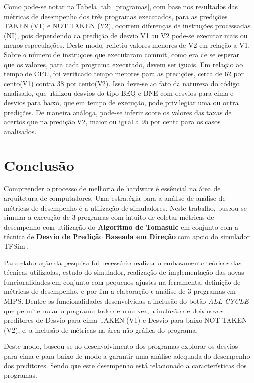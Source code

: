 \documentclass[12pt]{article}
\begin{document}
Como pode-se notar na Tabela \ref{tab_programas}, com base nos resultados das métricas de desempenho dos três programas executados, para as predições TAKEN (V1) e NOT TAKEN (V2), ocorrem diferenças de instruções processadas (NI), pois dependendo da predição de desvio V1 ou V2 pode-se executar mais ou menos especulações. Deste modo, refletiu valores menores de V2 em relação a V1. Sobre o número de instruçoes que executaram commit, como era de se esperar que os valores, para cada programa executado, devem ser iguais. Em relação ao tempo de CPU, foi verificado tempo menores para as predições, cerca de 62 por cento(V1) contra 38 por cento(V2). Isso deve-se ao fato da natureza do código analisado, que utilizou desvios do tipo BEQ e BNE com desvios para cima e desvios para baixo, que em tempo de execução, pode privilegiar uma ou outra predições. De maneira análoga, pode-se inferir sobre os valores das taxas de acertos que na predição V2, maior ou igual a 95 por cento para os casos analisados.

\section{Conclusão}\label{sec:figs}

Compreender o processo de melhoria de hardware é essêncial na área de arquitetura de computadores. Uma estratégia para a análise de análise de métricas de desempenho é a utilização de simuladores. Neste trabalho, buscou-se simular a execução de 3 programas com intuito de coletar métricas de desempenho com utilização do \textbf{Algoritmo de Tomasulo} em conjunto com a  técnica de \textbf{Desvio de Predição Baseada em Direção} com apoio  do simulador TFSim \cite{lucas:2019}.

Para elaboração da pesquisa foi necessário realizar o embasamento teóricos das técnicas utilizadas, estudo do simulador, realização de implementação das novas funcionalidades em conjunto com pequenos ajustes na ferramenta, definição de métricas de desempenho, e por fim a elaboração e análise de 3 programas em MIPS. Dentre as funcionalidades desenvolvidas a inclusão do botão \textit{ALL CYCLE} que permite rodar o programa todo de uma vez, a inclusão de dois novos preditores  de Desvio para cima TAKEN (V1) e Desvio para baixo NOT TAKEN (V2), e, a inclusão de métricas na área não gráfica do programa.

Deste modo, buscou-se no desenvolvimento dos programas explorar os desvios para cima e para baixo de modo a garantir uma análise adequada do desempenho dos preditores. Sendo que este desempenho está relacionado a características dos programas.
\end{document}
